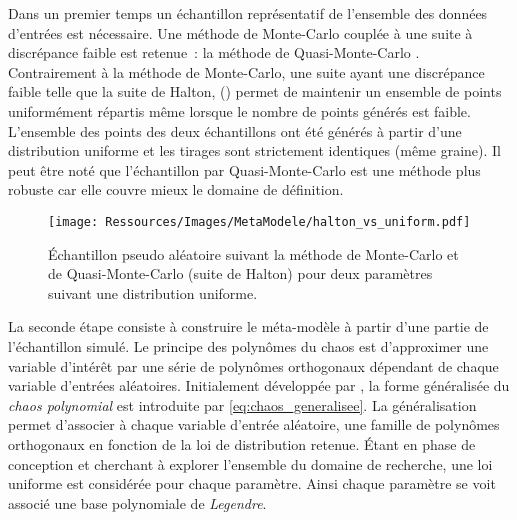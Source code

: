 Dans un premier temps un échantillon représentatif de l’ensemble des données d’entrées est
nécessaire. Une méthode de Monte-Carlo couplée à une suite à discrépance faible est retenue~: la
méthode de Quasi-Monte-Carlo \parencite{Caflisch19981}. Contrairement à la méthode de
Monte-Carlo, une suite ayant une discrépance faible telle que la suite de Halton,
() permet de maintenir un ensemble de
points uniformément répartis même lorsque le nombre de points générés est faible.
L’ensemble des points des deux échantillons ont été générés à partir d’une
distribution uniforme et les tirages sont strictement identiques (même graine).
Il peut être noté que l’échantillon par Quasi-Monte-Carlo est une méthode plus robuste car elle
couvre mieux le domaine de définition.
\begin{figure}
    \centering
    \texttt{[image: Ressources/Images/MetaModele/halton\_vs\_uniform.pdf]}
    \caption[Échantillon suivant la méthode de Monte-Carlo et de Quasi-Monte-Carlo]
            {Échantillon pseudo aléatoire suivant la méthode de Monte-Carlo et de
             Quasi-Monte-Carlo (suite de Halton) pour deux paramètres suivant une
             distribution uniforme.}
    \label{fig:halton_vs_uniform}
\end{figure}

La seconde étape consiste à construire le méta-modèle à partir d’une partie de
l’échantillon simulé. Le principe des polynômes du chaos est
d’approximer une variable d’intérêt par une série de polynômes orthogonaux dépendant de
chaque variable d’entrées aléatoires. Initialement développée par \textcite{Wiener1938897},
la forme généralisée du \textit{chaos polynomial} est introduite par \textcite{Xiu2002619}
\eqref{eq:chaos_generalisee}. La généralisation permet d’associer à chaque variable
d’entrée aléatoire, une famille de polynômes orthogonaux en fonction de la loi de
distribution retenue. Étant en phase de conception et cherchant à explorer l’ensemble du
domaine de recherche, une loi uniforme est considérée pour chaque paramètre. Ainsi chaque
paramètre se voit associé une base polynomiale de \textit{Legendre}.

